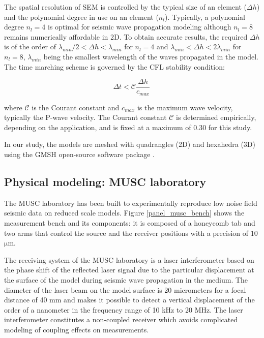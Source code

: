 \documentclass[manuscript,revised]{geophysics}
\begin{document}
\noindent The spatial resolution of SEM is controlled by the typical size of an element ($\Delta h$) and the polynomial degree in use on an element ($n_{l}$). Typically, a polynomial degree $n_{l}=4$ is optimal for seismic wave propagation modeling \citep{moczo2011finite} although $n_{l}=8$ remains numerically affordable in 2D. To obtain accurate results, the required $\Delta h$ is of the order of $\lambda_{min} /2 < \Delta h < \lambda_{min}$ for $n_{l}=4$ and $\lambda_{min} < \Delta h < 2\lambda_{min}$ for $n_{l}=8$, $\lambda_{min}$ being the smallest wavelength of the waves propagated in the model. The time marching scheme is governed by the CFL stability condition:

\begin{equation}
\Delta t < \mathcal{C}\frac{\Delta h}{c_{max}}\, 
\end{equation}

\noindent where $\mathcal{C}$ is the Courant constant and $c_{max}$ is the maximum wave velocity, typically the P-wave velocity. The Courant constant $\mathcal{C}$ is determined empirically, depending on the application, and is fixed at a maximum of 0.30 for this study.

\noindent In our study, the models are meshed with quadrangles (2D) and hexahedra (3D) using the GMSH open-source software package \citep{Geuzaine_MSH_2009}. 


\subsection{Physical modeling: MUSC laboratory}

\noindent The MUSC laboratory \citep{Bretaudeau_SSA_2008b,Bretaudeau_SSM_2011,Bretaudeau_FWI_2013} has been built to experimentally reproduce low noise field seismic data on reduced scale models. Figure \ref{panel_musc_bench} shows the measurement bench and its components: it is composed of a honeycomb tab and two arms that control the source and the receiver positions with a precision of 10 $\mathrm{\mu m}$.

\noindent The receiving system of the MUSC laboratory is a laser interferometer based on the phase shift of the reflected laser signal due to the particular displacement at the surface of the model during seismic wave propagation in the medium. The diameter of the laser beam on the model surface is 20 micrometers for a focal distance of 40 mm and makes it possible to detect a vertical displacement of the order of a nanometer in the frequency range of 10 kHz to 20 MHz. The laser interferometer constitutes a non-coupled receiver which avoids complicated modeling of coupling effects on measurements.
\end{document}
